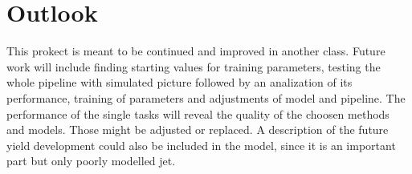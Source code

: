 \section{Outlook}\label{sec:outlook}

This prokect is meant to be continued and improved in another class. Future work will include finding starting values for training parameters, testing the whole pipeline with simulated picture followed by an analization of its performance, training of parameters and
adjustments of model and pipeline. The performance of the single tasks will reveal the quality of the choosen methods and models. Those might be adjusted or replaced. A description of the future yield development could also be included in the model, since it is an important part but only poorly modelled jet.
